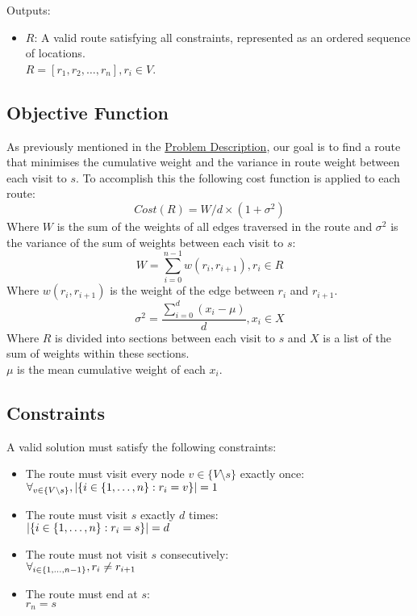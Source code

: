 Outputs:
    \begin{itemize}
    \item $R$: A valid route satisfying all constraints, represented as an ordered sequence of locations.\\
    $R = [r_1, r_2, \dots, r_n], r_i \in V$.
\end{itemize}

\subsection{Objective Function}\label{subsec:objective-function}
As previously mentioned in the \hyperref[subsec:problem-description]{Problem Description}, our goal is to find a
route that minimises the cumulative weight and the variance in route weight between each visit to $s$.
To accomplish this the following cost function is applied to each route:
\begin{equation}
    Cost(R) = W/d \times (1 + \sigma^2)\label{eq:cost}
\end{equation}
Where $W$ is the sum of the weights of all edges traversed in the route and $\sigma^2$ is the variance of the
sum of weights between each visit to $s$:
\begin{equation}
    W = \sum_{i=0}^{n-1} w(r_i, r_{i+1}), r_i \in R\label{eq:weight}
\end{equation}
Where $w(r_i, r_{i+1})$ is the weight of the edge between $r_i$ and $r_{i+1}$.
\begin{equation}
    \sigma^2 = \frac{\sum_{i=0}^{d}(x_i-\mu)}{d}, x_i \in X\label{eq:standard-deviation}
\end{equation}
Where $R$ is divided into sections between each visit to $s$ and $X$ is a list of the sum of weights within these
sections.\\
$\mu$ is the mean cumulative weight of each $x_i$.

\subsection{Constraints}\label{subsec:problem-constraints}
A valid solution must satisfy the following constraints:
\begin{itemize}
    \item The route must visit every node $v \in \{V \setminus s\}$ exactly once:\\
    $\forall_{v \in \{V \setminus s\}}, |\{i \in \{1, \mathellipsis, n\}: r_i = v\}| = 1$
    \item The route must visit $s$ exactly $d$ times:\\
    $|\{i \in \{1, \mathellipsis, n\}: r_i = s\}| = d$
    \item The route must not visit $s$ consecutively:\\
    $\forall_{i \in \{1, \mathellipsis, n-1\}}, r_i \neq r_{i+1}$
    \item The route must end at $s$:\\
    $r_n = s$
\end{itemize}
